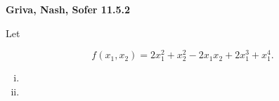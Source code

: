 \textbf{Griva, Nash, Sofer 11.5.2}

Let

$$
f(x_1, x_2) = 2 x_1^2 + x_2^2 - 2 x_1 x_2 + 2x_1^3 + x_1^4.
$$

\begin{enumerate}[(i)]
    \item 
    \pagebreak
    \item 
\end{enumerate}
